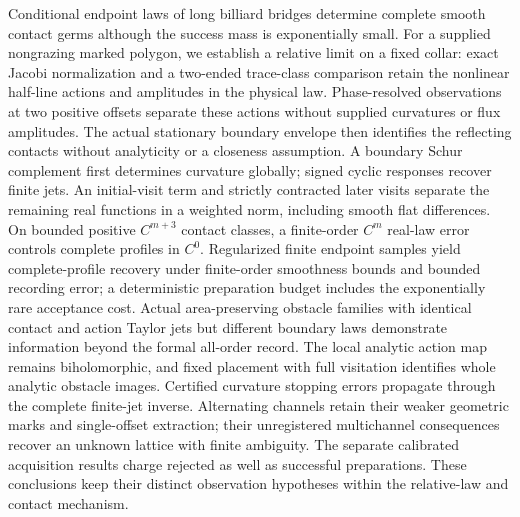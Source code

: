 Conditional endpoint laws of long billiard bridges determine complete
smooth contact germs although the success mass is exponentially small.
For a supplied nongrazing marked polygon, we establish a relative limit
on a fixed collar: exact Jacobi normalization and a two-ended trace-class
comparison retain the nonlinear half-line actions and amplitudes in the
physical law.  Phase-resolved observations at two positive offsets
separate these actions without supplied curvatures or flux amplitudes.
The actual stationary boundary envelope then identifies the reflecting
contacts without analyticity or a closeness assumption.  A boundary
Schur complement first determines curvature globally; signed cyclic
responses recover finite jets.  An initial-visit term and strictly
contracted later visits separate the remaining real functions in a
weighted norm, including smooth flat differences.  On bounded positive
$C^{m+3}$ contact classes, a finite-order $C^m$ real-law error controls
complete profiles in $C^0$.  Regularized finite endpoint samples yield complete-profile recovery under
finite-order smoothness bounds and bounded recording error; a deterministic
preparation budget includes the exponentially rare acceptance cost.
Actual area-preserving obstacle families
with identical contact and action Taylor jets but different boundary
laws demonstrate information beyond the formal all-order record.
The local analytic action map remains biholomorphic, and fixed placement
with full visitation identifies whole analytic obstacle images.
Certified curvature stopping errors propagate through the complete
finite-jet inverse.  Alternating channels retain their weaker geometric
marks and single-offset extraction; their unregistered multichannel
consequences recover an unknown lattice with finite ambiguity.  The
separate calibrated acquisition results charge rejected as well as
successful preparations.  These conclusions keep their distinct
observation hypotheses within the relative-law and contact mechanism.
